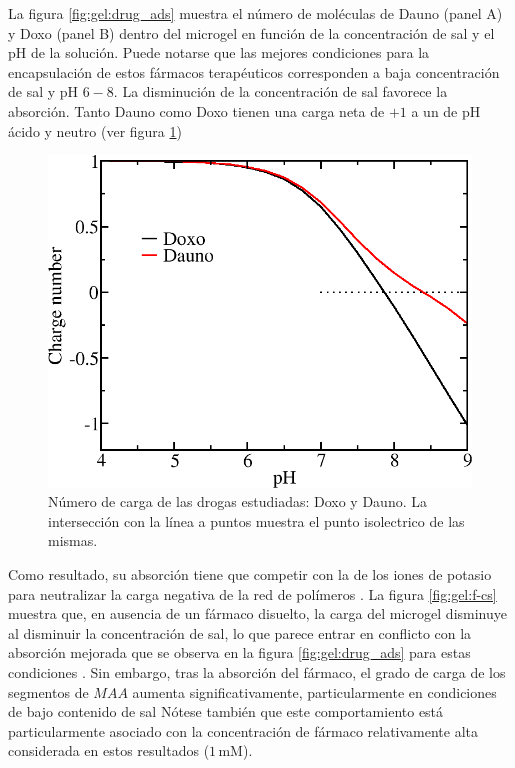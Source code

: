La figura \ref{fig:gel:drug_ads} muestra el n\'umero de mol\'eculas de Dauno (panel A) y Doxo (panel B) dentro del microgel en funci\'on de la concentraci\'on de sal y el pH de la soluci\'on.
Puede notarse que las mejores condiciones para la encapsulaci\'on de estos f\'armacos terap\'euticos corresponden a baja concentraci\'on de sal y pH $6-8$.
La disminuci\'on de la concentraci\'on de sal favorece la absorci\'on.
Tanto Dauno como Doxo tienen una carga neta de $+1$ a un  de pH \'acido y neutro (ver figura \ref{fig:gel:carga-drug_ads})


\begin{figure}[!tb]
	\centering
	\includegraphics[width=0.9\linewidth]{Figures/graph-gel/drugs-Q.png}
	\caption{N\'umero de carga de las drogas estudiadas: Doxo y Dauno. La intersecci\'on con la l\'inea a puntos muestra el punto isolectrico de las mismas.}
	\label{fig:gel:carga-drug_ads}
\end{figure}




Como resultado, su absorci\'on tiene que competir con la de los iones de potasio para neutralizar la carga negativa de la red de pol\'imeros \cite{PerezChavez2020}.
La figura \ref{fig:gel:f-cs} muestra que, en ausencia de un f\'armaco disuelto, la carga del microgel disminuye al disminuir la concentraci\'on de sal, lo que parece entrar en conflicto con la absorci\'on mejorada que se observa en la figura \ref{fig:gel:drug_ads} para estas condiciones .
Sin embargo, tras la absorci\'on del f\'armaco, el grado de carga de los segmentos de $MAA$ aumenta significativamente, particularmente en condiciones de bajo contenido de sal %
N\'otese tambi\'en que este comportamiento est\'a particularmente asociado con la concentraci\'on de f\'armaco relativamente alta considerada en estos resultados ($1\,$mM).

